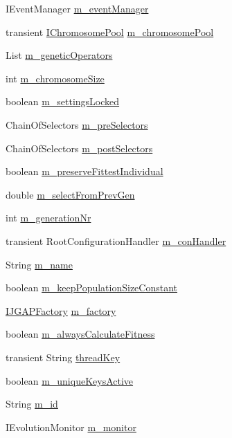 \begin{DoxyCompactItemize}
\item 
I\-Event\-Manager \hyperlink{classorg_1_1jgap_1_1_configuration_af3503f5ca62916503e5f0aa46a6ab910}{m\-\_\-event\-Manager}
\item 
transient \hyperlink{interfaceorg_1_1jgap_1_1_i_chromosome_pool}{I\-Chromosome\-Pool} \hyperlink{classorg_1_1jgap_1_1_configuration_a0d0f85cab0c95d8a6fe769811da7e818}{m\-\_\-chromosome\-Pool}
\item 
List \hyperlink{classorg_1_1jgap_1_1_configuration_a5c1c959a3176d21aecca50807c6001f8}{m\-\_\-genetic\-Operators}
\item 
int \hyperlink{classorg_1_1jgap_1_1_configuration_a21b467964361e74f6dcf74a27e2585eb}{m\-\_\-chromosome\-Size}
\item 
boolean \hyperlink{classorg_1_1jgap_1_1_configuration_a43fe72f071caf988406e96d35072192a}{m\-\_\-settings\-Locked}
\item 
Chain\-Of\-Selectors \hyperlink{classorg_1_1jgap_1_1_configuration_a9ff1c9baa4657e597fdb86e4ae55c3aa}{m\-\_\-pre\-Selectors}
\item 
Chain\-Of\-Selectors \hyperlink{classorg_1_1jgap_1_1_configuration_a9328a49ae6f8f5aede05d31433b563eb}{m\-\_\-post\-Selectors}
\item 
boolean \hyperlink{classorg_1_1jgap_1_1_configuration_acf752896310c978f999d484562ca3f07}{m\-\_\-preserve\-Fittest\-Individual}
\item 
double \hyperlink{classorg_1_1jgap_1_1_configuration_a7514f1eb7143283292cf85bd946bebfc}{m\-\_\-select\-From\-Prev\-Gen}
\item 
int \hyperlink{classorg_1_1jgap_1_1_configuration_ae42ade47e4025ee1260a8c1190b1e370}{m\-\_\-generation\-Nr}
\item 
transient Root\-Configuration\-Handler \hyperlink{classorg_1_1jgap_1_1_configuration_a1128ebf6ce77d77c7c47671f1013247e}{m\-\_\-con\-Handler}
\item 
String \hyperlink{classorg_1_1jgap_1_1_configuration_a07c3f6ff3365065b052d914c9d3a4124}{m\-\_\-name}
\item 
boolean \hyperlink{classorg_1_1jgap_1_1_configuration_a9af68cb4e7f1b5626cf053862ec1004a}{m\-\_\-keep\-Population\-Size\-Constant}
\item 
\hyperlink{interfaceorg_1_1jgap_1_1_i_j_g_a_p_factory}{I\-J\-G\-A\-P\-Factory} \hyperlink{classorg_1_1jgap_1_1_configuration_ac5cefe752b75153b80e8bbc9eba9384d}{m\-\_\-factory}
\item 
boolean \hyperlink{classorg_1_1jgap_1_1_configuration_a4ba366faf12d528ddcbe0670bf036868}{m\-\_\-always\-Calculate\-Fitness}
\item 
transient String \hyperlink{classorg_1_1jgap_1_1_configuration_a4057fbe057ac78353d7ad87db1f816d5}{thread\-Key}
\item 
boolean \hyperlink{classorg_1_1jgap_1_1_configuration_abfd8c1a4bf558d211afb47e904bac68e}{m\-\_\-unique\-Keys\-Active}
\item 
String \hyperlink{classorg_1_1jgap_1_1_configuration_aec6f6b65a70c6bb305eeff95bb64032c}{m\-\_\-id}
\item 
I\-Evolution\-Monitor \hyperlink{classorg_1_1jgap_1_1_configuration_a6e584063d1fe448e9faa3220d232eebc}{m\-\_\-monitor}
\end{DoxyCompactItemize}
